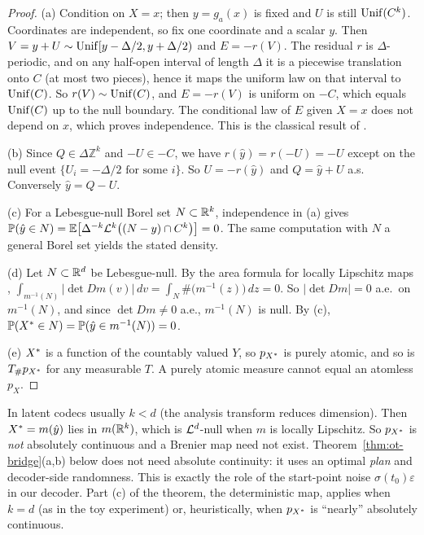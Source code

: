 \begin{proof}
(a) Condition on $X=x$; then $y=g_a(x)$ is fixed and $U$ is still $\mathrm{Unif}(C^k)$. Coordinates are independent, so fix one coordinate and a scalar $y$. Then $V=y+U\sim\mathrm{Unif}[y-\Delta/2,y+\Delta/2)$ and $E=-r(V)$. The residual $r$ is $\Delta$-periodic, and on any half-open interval of length $\Delta$ it is a piecewise translation onto $C$ (at most two pieces), hence it maps the uniform law on that interval to $\mathrm{Unif}(C)$. So $r(V)\sim\mathrm{Unif}(C)$, and $E=-r(V)$ is uniform on $-C$, which equals $\mathrm{Unif}(C)$ up to the null boundary. The conditional law of $E$ given $X=x$ does not depend on $x$, which proves independence. This is the classical result of \cite{schuchman1964dither,gray1993dithered}.

(b) Since $Q\in\Delta\mathbb{Z}^k$ and $-U\in -C$, we have $r(\hat y)=r(-U)=-U$ except on the null event $\{U_i=-\Delta/2 \text{ for some } i\}$. So $U=-r(\hat y)$ and $Q=\hat y+U$ a.s. Conversely $\hat y=Q-U$.

(c) For a Lebesgue-null Borel set $N\subset\mathbb{R}^k$, independence in (a) gives $\mathbb{P}(\hat y\in N)=\mathbb{E}\bigl[\Delta^{-k}\mathcal{L}^k\bigl((N-y)\cap C^k\bigr)\bigr]=0$. The same computation with $N$ a general Borel set yields the stated density.

(d) Let $N\subset\mathbb{R}^d$ be Lebesgue-null. By the area formula for locally Lipschitz maps \cite[Thm.~3.9]{evans2015measure},
$\int_{m^{-1}(N)}|\det Dm(v)|\,dv=\int_N \#\bigl(m^{-1}(z)\bigr)\,dz=0$.
So $|\det Dm|=0$ a.e.\ on $m^{-1}(N)$, and since $\det Dm\neq0$ a.e., $m^{-1}(N)$ is null. By (c), $\mathbb{P}(X^{*}\in N)=\mathbb{P}(\hat y\in m^{-1}(N))=0$.

(e) $X^{*}$ is a function of the countably valued $Y$, so $p_{X^{*}}$ is purely atomic, and so is $T_\#p_{X^{*}}$ for any measurable $T$. A purely atomic measure cannot equal an atomless $p_X$.
\end{proof}

\begin{remark}\label{rem:dimred}
In latent codecs usually $k<d$ (the analysis transform reduces dimension). Then $X^{*}=m(\hat y)$ lies in $m(\mathbb{R}^k)$, which is $\mathcal{L}^d$-null when $m$ is locally Lipschitz. So $p_{X^{*}}$ is \emph{not} absolutely continuous and a Brenier map need not exist. Theorem~\ref{thm:ot-bridge}(a,b) below does not need absolute continuity: it uses an optimal \emph{plan} and decoder-side randomness. This is exactly the role of the start-point noise $\sigma(t_0)\varepsilon$ in our decoder. Part (c) of the theorem, the deterministic map, applies when $k=d$ (as in the toy experiment) or, heuristically, when $p_{X^{*}}$ is ``nearly'' absolutely continuous.
\end{remark}

